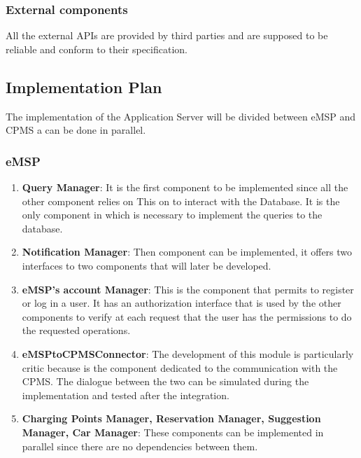 \subsubsection{External components} 
All the external APIs are provided by third parties and are supposed to be reliable and conform to their specification. 

\subsection{Implementation Plan}
The implementation of the Application Server will be divided between eMSP and CPMS a can be done in parallel.
\subsubsection{eMSP}
\begin{enumerate}
    \item \textbf{Query Manager}: It is the first component to be implemented since all the other component relies on This
    on to interact with the Database. It is the only component in which is necessary to implement the queries to the database.
    \item \textbf{Notification Manager}: Then component can be implemented, it offers two interfaces to two components that will later 
    be developed.
    \item \textbf{eMSP's account Manager}: This is the component that permits to register or log in a user. It has an authorization interface that 
    is used by the other components to verify at each request that the user has the permissions to do the requested operations.
    \item \textbf{eMSPtoCPMSConnector}: The development of this module is particularly critic because is the component dedicated
    to the communication with the CPMS. The dialogue between the two can be simulated during the implementation and tested after the integration.
    \item \textbf{Charging Points Manager, Reservation Manager, Suggestion Manager, Car Manager}: These components can be implemented
    in parallel since there are no dependencies between them. 
\end{enumerate}
